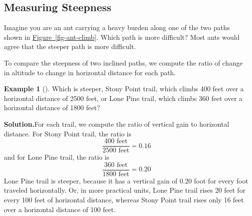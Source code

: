 \documentclass[10pt,]{book}
\theoremstyle{plain}
\theoremstyle{definition}
\theoremstyle{definition}
\newtheorem{example}[theorem]{Example}
\numberwithin{equation}{section}
\newcounter{figstack}
\newcounter{figindex}
\newlength\fight
\newcommand\pushValignCaptionBottom[5][b]{%
\stepcounter{figstack}%
\expandafter\def\csname %
figalign\romannumeral\value{figstack}\endcsname{#1}%
\expandafter\def\csname %
figtype\romannumeral\value{figstack}\endcsname{#2}%
\expandafter\def\csname %
figwd\romannumeral\value{figstack}\endcsname{#3}%
\expandafter\def\csname %
figcontent\romannumeral\value{figstack}\endcsname{#4}%
\expandafter\def\csname %
figcap\romannumeral\value{figstack}\endcsname{#5}%
\setbox0=\hbox{%
\begin{#2}{#3}#4\end{#2}}%
\ifdim\dimexpr\ht0+\dp0\relax>\fight\global\setlength{\fight}{%
\dimexpr\ht0+\dp0\relax}\fi%
}
\newcommand\popValignCaptionBottom{%
\setcounter{figindex}{0}%
\hfill%
\whiledo{\value{figindex}<\value{figstack}}{%
\stepcounter{figindex}%
\def\tmp{\csname figwd\romannumeral\value{figindex}\endcsname}%
\begin{\csname figtype\romannumeral\value{figindex}\endcsname}[t]{\tmp}%
\centering%
\stackinset{c}{}%
{\csname figalign\romannumeral\value{figindex}\endcsname}{}%
{\csname figcontent\romannumeral\value{figindex}\endcsname}%
{\rule{0pt}{\fight}}\par%
\csname figcap\romannumeral\value{figindex}\endcsname%
\end{\csname figtype\romannumeral\value{figindex}\endcsname}%
\hfill%
}%
\setcounter{figstack}{0}%
\setlength{\fight}{0pt}%
\hfill%
}
\begin{document}
\subsection[Measuring Steepness]{Measuring Steepness}\label{subsection-18}
Imagine you are an ant carrying a heavy burden along one of the two paths shown in \hyperref[fig-ant-climb]{Figure~\ref{fig-ant-climb}}. Which path is more difficult? Most ants would agree that the steeper path is more difficult. %
\leavevmode%
\par
To compare the steepness of two inclined paths, we compute the ratio of change in
altitude to change in horizontal distance for each path.%
\begin{example}[]\label{example-steep-trail}
Which is steeper, Stony Point trail, which climbs 400 feet over a horizontal distance of 2500 feet, or Lone Pine trail, which climbs 360 feet over a horizontal distance of 1800 feet?%
\par\medskip\noindent%
\textbf{Solution.}\quad For each trail, we compute the ratio of vertical gain to horizontal distance. For Stony Point trail, the ratio is
    \begin{equation*}\frac{400 \text{ feet}}{2500 \text{ feet}}= 0.16 \end{equation*}  
    and for Lone Pine trail, the ratio is
    \begin{equation*}\frac{360 \text{ feet}}{1800 \text{ feet}}= 0.20 \end{equation*} 
    Lone Pine trail is steeper, because it has a vertical gain of 0.20 foot for every foot traveled horizontally. Or, in more practical units, Lone Pine trail rises 20 feet for every 100 feet of horizontal distance, whereas Stony Point trail rises only 16 feet over a horizontal distance of 100 feet.%
\end{example}
\end{document}
